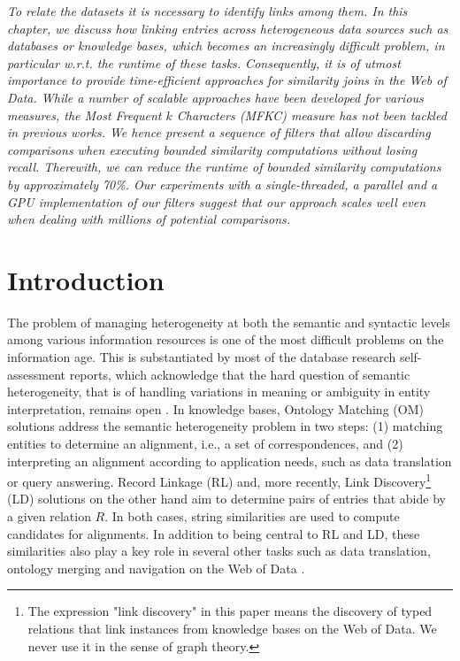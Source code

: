 \textit{To relate the datasets it is necessary to identify links among them. In this chapter, we discuss how linking entries across heterogeneous data sources such as databases or knowledge bases, which becomes an increasingly difficult problem, in particular w.r.t. the runtime of these tasks. 
Consequently, it is of utmost importance to provide time-efficient approaches for similarity joins in the Web of Data. 
While a number of scalable approaches have been developed for various measures, the Most Frequent $k$ Characters (MFKC) measure has not been tackled in previous works. 
We hence present a sequence of filters that allow discarding comparisons when executing bounded similarity computations without losing recall. 
Therewith, we can reduce the runtime of bounded similarity computations by approximately 70\%.  
Our experiments with a single-threaded, a parallel and a GPU implementation of our filters suggest that our approach scales well even when dealing with millions of potential comparisons.}

\section{Introduction}
The problem of managing heterogeneity at both the semantic and syntactic levels among various information resources \cite{valdestilhasdbpediasameas,shvaiko2013ontology} is one of the most difficult problems on the information age.
This is substantiated by most of the database research self-assessment reports, which acknowledge that the hard question of semantic heterogeneity, that is of handling variations in meaning or ambiguity in entity interpretation, remains open \cite{shvaiko2013ontology}. In knowledge bases, Ontology Matching (OM) solutions address the semantic heterogeneity problem in two steps: (1) matching entities to determine an alignment, i.e., a set of correspondences, and (2) interpreting an alignment according to application needs, such as data translation or query answering. Record Linkage (RL) and, more recently, Link Discovery\footnote{The expression "link discovery" in this paper means the discovery of typed relations that link instances from knowledge bases on the Web of Data. We never use it in the sense of graph theory.} (LD) solutions on the other hand aim to determine pairs of entries that abide by a given relation $R$. In both cases, string similarities are used  to compute candidates for alignments. %
In addition to being central to RL and LD, these similarities also play a key role in several other tasks such as data translation, ontology merging and navigation on the Web of Data \cite{shvaiko2013ontology,euzenat2007ontology}.


